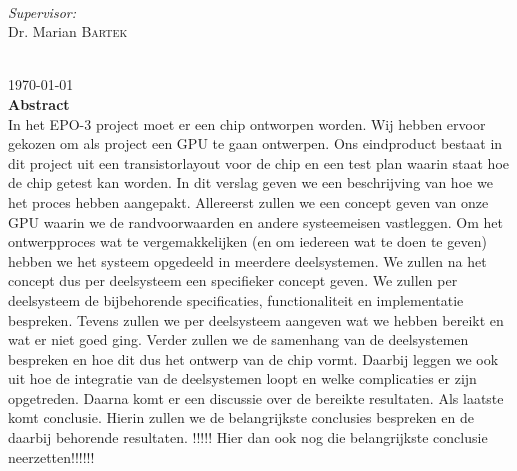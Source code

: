 \documentclass[12pt]{scrreprt}
\begin{document}
\begin{titlepage}
\begin{minipage}{0.4\textwidth}
\begin{flushleft}
\end{flushleft}
\end{minipage}
~
\begin{minipage}{0.4\textwidth}
\begin{flushright} \large
\emph{Supervisor:} \\
Dr. Marian \textsc{Bartek} %
\end{flushright}
\end{minipage}\\[3cm]



{\large \today}\\ [1.5cm]


 
% 

\textbf{Abstract} \\
In het EPO-3 project moet er een chip ontworpen worden. Wij hebben ervoor gekozen om als project een GPU te gaan ontwerpen. Ons eindproduct bestaat in dit project uit een transistorlayout voor de chip en een test plan waarin staat hoe de chip getest kan worden.
In dit verslag geven we een beschrijving van hoe we het proces hebben aangepakt. Allereerst zullen we een concept geven van onze GPU waarin we de randvoorwaarden en andere systeemeisen vastleggen. Om het ontwerpproces wat te vergemakkelijken (en om iedereen wat te doen te geven) hebben we het systeem opgedeeld in meerdere deelsystemen. We zullen na het concept dus per deelsysteem een specifieker concept geven. We zullen per deelsysteem de bijbehorende specificaties, functionaliteit en implementatie bespreken. Tevens zullen we per deelsysteem aangeven wat we hebben bereikt en wat er niet goed ging. Verder zullen we de samenhang van de deelsystemen bespreken en hoe dit dus het ontwerp van de chip vormt. Daarbij leggen we ook uit hoe de integratie van de deelsystemen loopt en welke complicaties er zijn opgetreden. Daarna komt er een discussie over de bereikte resultaten. Als laatste komt conclusie. Hierin zullen we de belangrijkste conclusies bespreken en de daarbij behorende resultaten. !!!!! Hier dan ook nog die belangrijkste conclusie neerzetten!!!!!!

\vfill %

\end{titlepage}
\end{document}
